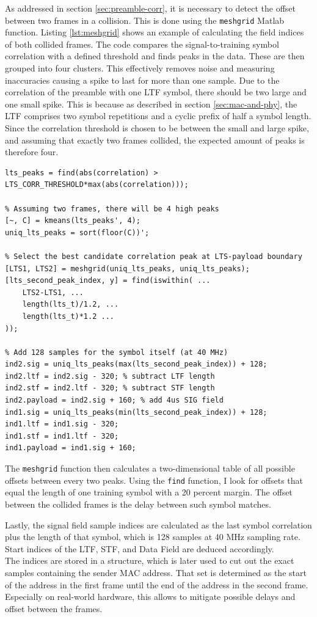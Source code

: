As addressed in section \ref{sec:preamble-corr}, it is necessary to detect the offset between two frames in a collision. This is done using the \texttt{meshgrid} Matlab function. Listing \ref{lst:meshgrid} shows an example of calculating the field indices of both collided frames. The code compares the signal-to-training symbol correlation with a defined threshold and finds peaks in the data. These are then grouped into four clusters. This effectively removes noise and measuring inaccuracies causing a spike to last for more than one sample. Due to the correlation of the preamble with one \gls{LTF} symbol, there should be two large and one small spike. This is because as described in section \ref{sec:mac-and-phy}, the \gls{LTF} comprises two symbol repetitions and a cyclic prefix of half a symbol length. Since the correlation threshold is chosen to be between the small and large spike, and assuming that exactly two frames collided, the expected amount of peaks is therefore four.

\begin{lstlisting}[captionpos=b,caption={Collision Offset Detection using Meshgrid},label=lst:meshgrid]
% Find peaks above a parametrized threshold
lts_peaks = find(abs(correlation) > LTS_CORR_THRESHOLD*max(abs(correlation)));

% Assuming two frames, there will be 4 high peaks
[~, C] = kmeans(lts_peaks', 4);
uniq_lts_peaks = sort(floor(C))';

% Select the best candidate correlation peak at LTS-payload boundary
[LTS1, LTS2] = meshgrid(uniq_lts_peaks, uniq_lts_peaks);
[lts_second_peak_index, y] = find(iswithin( ...
    LTS2-LTS1, ...
    length(lts_t)/1.2, ...
    length(lts_t)*1.2 ...
));

% Add 128 samples for the symbol itself (at 40 MHz)
ind2.sig = uniq_lts_peaks(max(lts_second_peak_index)) + 128;
ind2.ltf = ind2.sig - 320; % subtract LTF length
ind2.stf = ind2.ltf - 320; % subtract STF length
ind2.payload = ind2.sig + 160; % add 4us SIG field
ind1.sig = uniq_lts_peaks(min(lts_second_peak_index)) + 128;
ind1.ltf = ind1.sig - 320;
ind1.stf = ind1.ltf - 320;
ind1.payload = ind1.sig + 160;
\end{lstlisting}

The \texttt{meshgrid} function then calculates a two-dimensional table of all possible offsets between every two peaks. Using the \texttt{find} function, I look for offsets that equal the length of one training symbol with a 20 percent margin.  The offset between the collided frames is the delay between such symbol matches.

Lastly, the signal field sample indices are calculated as the last symbol correlation plus the length of that symbol, which is 128 samples at 40 MHz sampling rate. Start indices of the \gls{LTF}, \gls{STF}, and Data Field are deduced accordingly.\\

The indices are stored in a structure, which is later used to cut out the exact samples containing the sender MAC address. That set is determined as the start of the address in the first frame until the end of the address in the second frame. Especially on real-world hardware, this allows to mitigate possible delays and offset between the frames.
